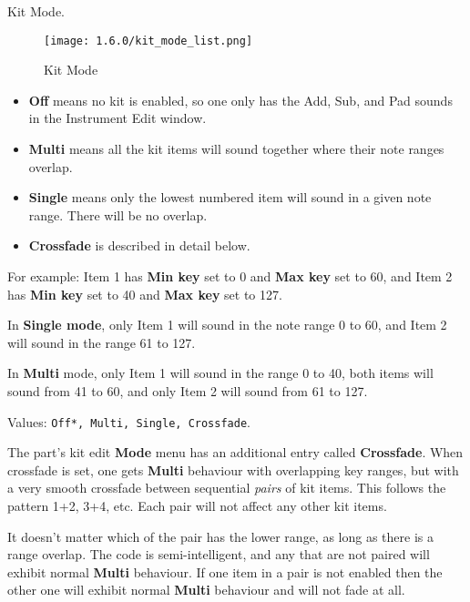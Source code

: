    Kit Mode.

\begin{figure}[H]
   \centering
   \texttt{[image: 1.6.0/kit\_mode\_list.png]}
   \caption{Kit Mode}
   \label{fig:kit_mode_list}
\end{figure}

   \begin{itemize}
      \item \textbf{Off} means no kit is enabled, so one only has the Add,
         Sub, and Pad sounds in the Instrument Edit window.
      \item \textbf{Multi} means all the kit items will sound together
         where their note ranges overlap.
      \item \textbf{Single} means only the lowest numbered item will sound
         in a given note range. There will be no overlap.
      \item \textbf{Crossfade} is described in detail below.
   \end{itemize}

   For example:
   Item 1 has \textbf{Min key} set to 0 and \textbf{Max key} set to 60, and
   Item 2 has \textbf{Min key} set to 40 and \textbf{Max key} set to 127.

   In \textbf{Single mode}, only Item 1 will sound in the note range 0 to
   60, and Item 2 will sound in the range 61 to 127.

   In \textbf{Multi} mode, only Item 1 will sound in the range 0 to 40, both
   items will sound from 41 to 60, and only Item 2 will sound from 61 to
   127.

   Values: \texttt{Off*, Multi, Single, Crossfade}.

   The part's kit edit \textbf{Mode} menu has an additional entry
   called \textbf{Crossfade}.
   When crossfade is set, one gets \textbf{Multi} behaviour with overlapping key
   ranges, but with a very smooth crossfade between sequential \textsl{pairs}
   of kit items. This follows the pattern 1+2, 3+4, etc. Each pair will not
   affect any other kit items.

   It doesn't matter which of the pair has the lower range, as long as there is
   a range overlap. The code is semi-intelligent, and any that are not paired
   will exhibit normal \textbf{Multi} behaviour. If one item in a pair is not
   enabled then the other one will exhibit normal \textbf{Multi} behaviour and
   will not fade at all.

